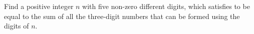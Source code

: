 Find a positive integer $n$ with five non-zero different digits, which satisfies to be equal to the sum of all the three-digit numbers that can be formed using the digits of $n$.